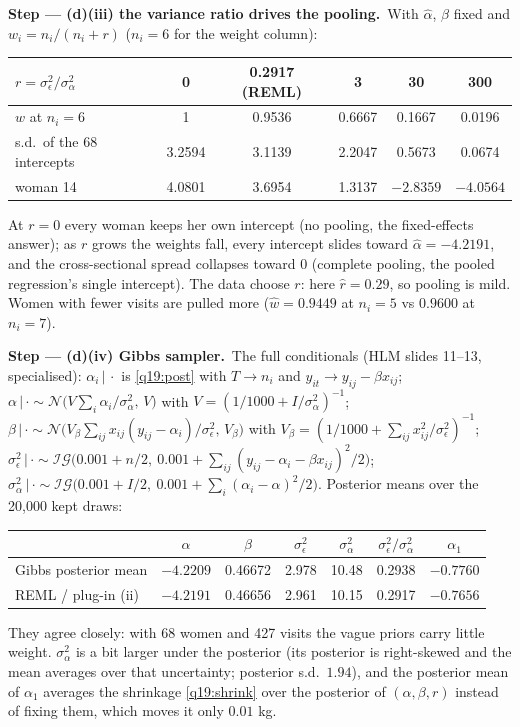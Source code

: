 \documentclass[11pt,a4paper]{article}
\numberwithin{equation}{questao}
\newcommand{\passo}[2]{\par\smallskip\noindent\textbf{Step --- #1.}~#2}
\newcommand{\N}{\mathcal{N}}
\newcommand{\IG}{\mathcal{IG}}
\begin{document}
\begin{sol}
\passo{(d)(iii) the variance ratio drives the pooling}{With $\hat\alpha$, $\hat\beta$ fixed and $w_i=n_i/(n_i+r)$ ($n_i=6$ for the
weight column):
\begin{center}\small
\begin{tabular}{lccccc}
\toprule
$r=\sigma_\epsilon^2/\sigma_\alpha^2$ & 0 & 0.2917 (REML) & 3 & 30 & 300\\
\midrule
$w$ at $n_i=6$ & 1 & 0.9536 & 0.6667 & 0.1667 & 0.0196\\
s.d.\ of the 68 intercepts & 3.2594 & 3.1139 & 2.2047 & 0.5673 & 0.0674\\
woman 14 & 4.0801 & 3.6954 & 1.3137 & $-2.8359$ & $-4.0564$\\
\bottomrule
\end{tabular}
\end{center}
At $r=0$ every woman keeps her own intercept (no pooling, the fixed-effects answer); as $r$ grows the weights fall,
every intercept slides toward $\hat\alpha=-4.2191$, and the cross-sectional spread collapses toward 0 (complete pooling,
the pooled regression's single intercept). The data choose $r$: here $\hat r=0.29$, so pooling is mild. Women with
fewer visits are pulled more ($\hat w=0.9449$ at $n_i=5$ vs $0.9600$ at $n_i=7$).}

\passo{(d)(iv) Gibbs sampler}{The full conditionals (HLM slides 11--13, specialised): $\alpha_i\,|\,\cdot$ is
\eqref{q19:post} with $T\to n_i$ and $y_{it}\to y_{ij}-\beta x_{ij}$;
$\alpha\,|\,\cdot\sim\N\big(V\textstyle\sum_i\alpha_i/\sigma_\alpha^2,\,V\big)$ with $V=(1/1000+I/\sigma_\alpha^2)^{-1}$;
$\beta\,|\,\cdot\sim\N\big(V_\beta\sum_{ij}x_{ij}(y_{ij}-\alpha_i)/\sigma_\epsilon^2,\,V_\beta\big)$ with $V_\beta=(1/1000+\sum_{ij}x_{ij}^2/\sigma_\epsilon^2)^{-1}$;
$\sigma_\epsilon^2\,|\,\cdot\sim\IG\big(0.001+n/2,\ 0.001+\sum_{ij}(y_{ij}-\alpha_i-\beta x_{ij})^2/2\big)$;
$\sigma_\alpha^2\,|\,\cdot\sim\IG\big(0.001+I/2,\ 0.001+\sum_i(\alpha_i-\alpha)^2/2\big)$. Posterior means over the 20{,}000 kept draws:
\begin{center}\small
\begin{tabular}{lcccccc}
\toprule
 & $\alpha$ & $\beta$ & $\sigma_\epsilon^2$ & $\sigma_\alpha^2$ & $\sigma_\epsilon^2/\sigma_\alpha^2$ & $\alpha_1$\\
\midrule
Gibbs posterior mean & $-4.2209$ & 0.46672 & 2.978 & 10.48 & 0.2938 & $-0.7760$\\
REML / plug-in (ii) & $-4.2191$ & 0.46656 & 2.961 & 10.15 & 0.2917 & $-0.7656$\\
\bottomrule
\end{tabular}
\end{center}
They agree closely: with 68 women and 427 visits the vague priors carry little weight. $\sigma_\alpha^2$ is a bit larger
under the posterior (its posterior is right-skewed and the mean averages over that uncertainty; posterior s.d.\ $1.94$),
and the posterior mean of $\alpha_1$ averages the shrinkage \eqref{q19:shrink} over the posterior of $(\alpha,\beta,r)$ instead of
fixing them, which moves it only $0.01$ kg.}


\end{sol}
\end{document}
